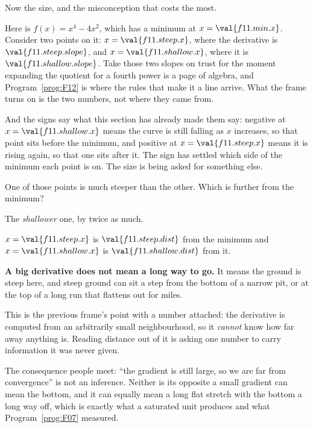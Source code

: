 \begin{fr}
Now the size, and the misconception that costs the most.

Here is $f(x) = x^{4} - 4x^{2}$, which has a minimum at
$x = \val{f11.min.x}$. Consider two points on it: $x = \val{f11.steep.x}$,
where the derivative is $\val{f11.steep.slope}$, and $x =
\val{f11.shallow.x}$, where it is $\val{f11.shallow.slope}$. Take those two
slopes on trust for the moment \dash{} expanding the quotient for a fourth
power is a page of algebra, and Program~\ref{prog:F12} is where the rules that
make it a line arrive. What the frame turns on is the two numbers, not where
they came from.

And the signs say what this section has already made them say: negative at
$x = \val{f11.shallow.x}$ means the curve is still falling as $x$ increases, so
that point sits before the minimum, and positive at $x = \val{f11.steep.x}$
means it is rising again, so that one sits after it. The sign has settled which
side of the minimum each point is on. The size is being asked for something
else.

One of those points is much steeper than the other. Which is further from the
minimum?
\dotline
\nextframe
\end{fr}

\begin{fr}
\begin{ansblock}
The \emph{shallower} one, by twice as much.
\end{ansblock}

$x = \val{f11.steep.x}$ is $\val{f11.steep.dist}$ from the minimum and
$x = \val{f11.shallow.x}$ is $\val{f11.shallow.dist}$ from it.

\begin{trapbox}
\textbf{A big derivative does not mean a long way to go.} It means the ground
is steep here, and steep ground can sit a step from the bottom of a narrow
pit, or at the top of a long run that flattens out for miles.

This is the previous frame's point with a number attached: the derivative is
computed from an arbitrarily small neighbourhood, so it \emph{cannot} know how
far away anything is. Reading distance out of it is asking one number to carry
information it was never given.

The consequence people meet: \enquote{the gradient is still large, so we are
far from convergence} is not an inference. Neither is its opposite \dash{} a
small gradient can mean the bottom, and it can equally mean a long flat
stretch with the bottom a long way off, which is exactly what a saturated unit
produces and what Program~\ref{prog:F07} measured.
\end{trapbox}

\end{fr}

